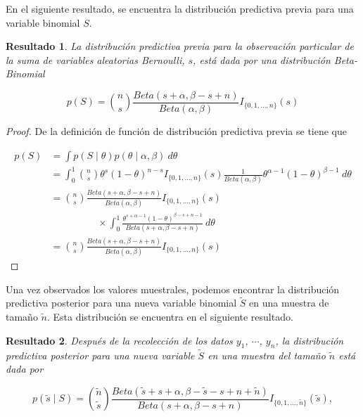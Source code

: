 \documentclass[
  10pt,
  spanish,
]{book}
\newtheorem{proposition}{Resultado}[chapter]
\theoremstyle{definition}
\theoremstyle{definition}
\theoremstyle{definition}
\theoremstyle{definition}
\theoremstyle{remark}
\begin{document}
En el siguiente resultado, se encuentra la distribución predictiva
previa para una variable binomial \(S\).

\begin{proposition}
\protect\hypertarget{prp:unnamed-chunk-13}{}{\label{prp:unnamed-chunk-13} }La distribución predictiva previa para la observación particular de la suma de variables aleatorias Bernoulli, \(s\), está dada por una distribución Beta-Binomial

\begin{equation}
p(S)=\binom{n}{s}\frac{Beta(s+\alpha,\beta-s+n)}{Beta(\alpha,\beta)}I_{\{0,1,\ldots,n\}}(s)
\end{equation}
\end{proposition}

\begin{proof}
{}De la definición de función de distribución predictiva previa se tiene que

\begin{align*}
p(S)
&=\int p(S \mid \theta)p(\theta \mid \alpha,\beta)\ d\theta\\
&=\int_0^1\binom{n}{s}\theta^s(1-\theta)^{n-s}I_{\{0,1,\ldots,n\}}(s)
\frac{1}{Beta(\alpha,\beta)}\theta^{\alpha-1}(1-\theta)^{\beta-1}\ d\theta\\
&=\binom{n}{s}\frac{Beta(s+\alpha,\beta-s+n)}{Beta(\alpha,\beta)}I_{\{0,1,\ldots,n\}}(s)\\
&\hspace{2cm}\times\int_0^1\frac{\theta^{s+\alpha-1}(1-\theta)^{\beta-s+n-1}}{Beta(s+\alpha,\beta-s+n)}\ d\theta\\
&=\binom{n}{s}\frac{Beta(s+\alpha,\beta-s+n)}{Beta(\alpha,\beta)}I_{\{0,1,\ldots,n\}}(s)
\end{align*}
\end{proof}

Una vez observados los valores muestrales, podemos encontrar la
distribución predictiva posterior para una nueva variable binomial
\(\tilde{S}\) en una muestra de tamaño \(\tilde{n}\). Esta distribución se
encuentra en el siguiente resultado.

\begin{proposition}
\protect\hypertarget{prp:ResPredBinom}{}{\label{prp:ResPredBinom} }Después de la recolección de los datos \(y_1\), \(\cdots\), \(y_n\), la distribución predictiva posterior para una nueva variable \(\tilde{S}\) en una muestra del tamaño \(\tilde{n}\) está dada por

\begin{equation}
\label{eq:Binompredict}
p(\tilde{s} \mid S)=\binom{\tilde{n}}{\tilde{s}}\frac{Beta(\tilde{s}+s+\alpha,\beta-\tilde{s}-s+n+\tilde{n})}{Beta(s+\alpha,\beta-s+n)}I_{\{0,1,\ldots,\tilde{n}\}}(\tilde{s}),
\end{equation}
\end{proposition}
\end{document}
